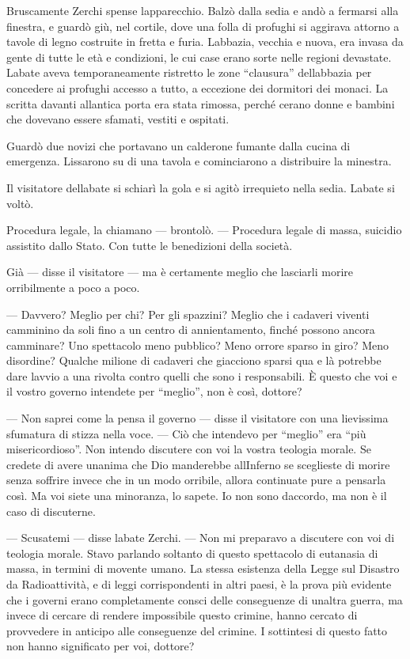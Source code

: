 Bruscamente Zerchi spense l\textquotesingle apparecchio. Balzò dalla
sedia e andò a fermarsi alla finestra, e guardò giù, nel cortile, dove
una folla di profughi si aggirava attorno a tavole di legno costruite in
fretta e furia. L\textquotesingle abbazia, vecchia e nuova, era invasa
da gente di tutte le età e condizioni, le cui case erano sorte nelle
regioni devastate. L\textquotesingle abate aveva temporaneamente
ristretto le zone ``clausura'' dell\textquotesingle abbazia per
concedere ai profughi accesso a tutto, a eccezione dei dormitori dei
monaci. La scritta davanti all\textquotesingle antica porta era stata
rimossa, perché c\textquotesingle erano donne e bambini che dovevano
essere sfamati, vestiti e ospitati.

Guardò due novizi che portavano un calderone fumante dalla cucina di
emergenza. L\textquotesingle issarono su di una tavola e cominciarono a
distribuire la minestra.

Il visitatore dell\textquotesingle abate si schiarì la gola e si agitò
irrequieto nella sedia. L\textquotesingle abate si voltò.

Procedura legale, la chiamano --- brontolò. --- Procedura legale di
massa, suicidio assistito dallo Stato. Con tutte le benedizioni della
società.

Già --- disse il visitatore --- ma è certamente meglio che lasciarli
morire orribilmente a poco a poco.

--- Davvero? Meglio per chi? Per gli spazzini? Meglio che i cadaveri
viventi camminino da soli fino a un centro di annientamento, finché
possono ancora camminare? Uno spettacolo meno pubblico? Meno orrore
sparso in giro? Meno disordine? Qualche milione di cadaveri che
giacciono sparsi qua e là potrebbe dare l\textquotesingle avvio a una
rivolta contro quelli che sono i responsabili. È questo che voi e il
vostro governo intendete per ``meglio'', non è così, dottore?

--- Non saprei come la pensa il governo --- disse il visitatore con una
lievissima sfumatura di stizza nella voce. --- Ciò che intendevo per
``meglio'' era ``più misericordioso''. Non intendo discutere con voi la
vostra teologia morale. Se credete di avere un\textquotesingle anima che
Dio manderebbe all\textquotesingle Inferno se sceglieste di morire senza
soffrire invece che in un modo orribile, allora continuate pure a
pensarla così. Ma voi siete una minoranza, lo sapete. Io non sono
d\textquotesingle accordo, ma non è il caso di discuterne.

--- Scusatemi --- disse l\textquotesingle abate Zerchi. --- Non mi
preparavo a discutere con voi di teologia morale. Stavo parlando
soltanto di questo spettacolo di eutanasia di massa, in termini di
movente umano. La stessa esistenza della Legge sul Disastro da
Radioattività, e di leggi corrispondenti in altri paesi, è la prova più
evidente che i governi erano completamente consci delle conseguenze di
un\textquotesingle altra guerra, ma invece di cercare di rendere
impossibile questo crimine, hanno cercato di provvedere in anticipo alle
conseguenze del crimine. I sottintesi di questo fatto non hanno
significato per voi, dottore?

